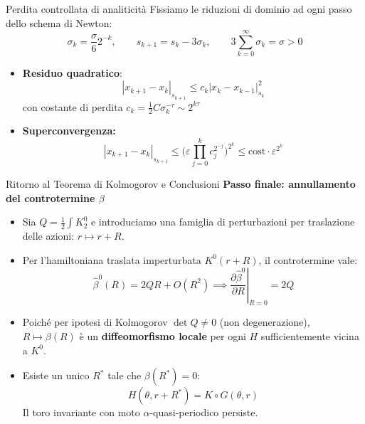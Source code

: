 \documentclass[10pt,aspectratio=169]{beamer}
\newcommand{\eps}{\varepsilon}
\newcommand{\blu}[1]{\textcolor{UniBlue}{\textbf{#1}}}
\begin{document}
\begin{frame}{Perdita controllata di analiticità}
  Fissiamo le riduzioni di dominio ad ogni passo dello schema di Newton:
  \[
    \sigma_k = \frac{\sigma}{6} 2^{-k}, \qquad s_{k+1} = s_k - 3\sigma_k, \qquad 3\sum_{k=0}^\infty \sigma_k = \sigma > 0
  \]
  \pause
  \begin{itemize}
      \item \blu{Residuo quadratico}:
      \[
        |x_{k+1} - x_k|_{s_{k+1}} \le c_k |x_k - x_{k-1}|_{s_k}^2
      \]
      con costante di perdita $c_k = \frac{1}{2} C \sigma_k^{-\tau} \sim 2^{k\tau}$
      \medskip
      \item \blu{Superconvergenza:}
      \[
        |x_{k+1} - x_k|_{s_{k+1}} \le \Big(\eps \prod_{j=0}^k c_j^{2^{-j}}\Big)^{2^k} \le \text{cost} \cdot \eps^{2^k}
      \]
  \end{itemize}
\end{frame}

\begin{frame}{Ritorno al Teorema di Kolmogorov e Conclusioni}
  \blu{Passo finale: annullamento del controtermine $\beta$}
  \begin{itemize}
    \item Sia $Q = \frac{1}{2}\int K^0_2$ e introduciamo una famiglia di perturbazioni per traslazione delle azioni: $r \mapsto r + R$.
    \item Per l'hamiltoniana traslata imperturbata $K^0(r+R)$, il controtermine vale:
    \[
      \widehat{\beta}^0(R) = 2QR + O(R^2) \implies \left.\frac{\partial \widehat{\beta}^0}{\partial R}\right|_{R=0} = 2Q
    \]
    \item Poiché per ipotesi di Kolmogorov $\det Q \neq 0$ (non degenerazione), $R \mapsto \beta(R)$ è un \textbf{diffeomorfismo locale} per ogni $H$ sufficientemente vicina a $K^0$.
    \item Esiste un unico $R^*$ tale che $\beta(R^*) = 0$:
    \[
      H(\theta, r+R^*) = K \circ G(\theta, r)
    \]
    Il toro invariante con moto $\alpha$-quasi-periodico persiste.
  \end{itemize}
\end{frame}
\end{document}
